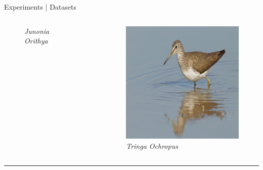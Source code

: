 \begin{frame}{Experiments | Datasets}
\begin{columns}
\begin{column}{0.2\textwidth}
\begin{figure}
        \captionsetup{labelformat=empty, justification=centering, font=scriptsize}
        \caption{\emph{Junonia Orithya}}
      \end{figure}
    \end{column}
    \begin{column}{0.2\textwidth}
      \begin{figure}
        \centering
        \includegraphics[width=.7\linewidth]{figures/iNaturalist19/example_3.jpg}
        \captionsetup{labelformat=empty, justification=centering, font=scriptsize}
        \caption{\emph{Tringa Ochropus}}
      \end{figure}
    \end{column}
  \end{columns}

  \rule{\linewidth}{0.4pt}


\end{frame}
